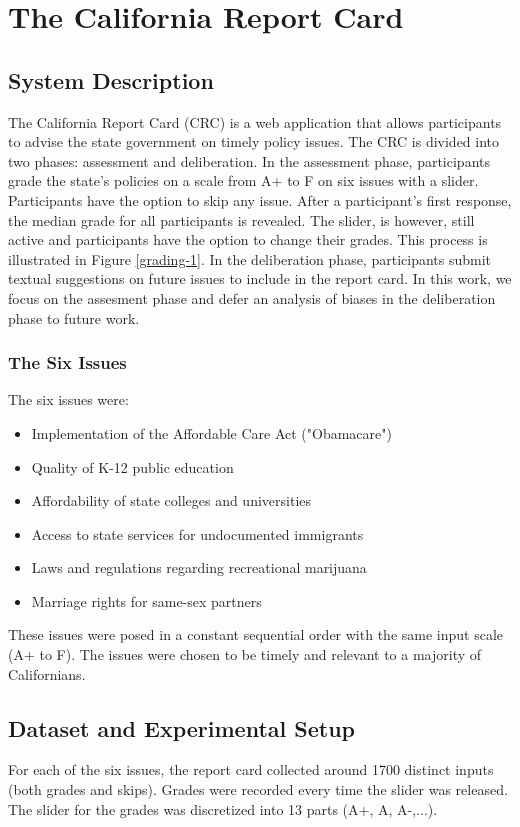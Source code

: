 \section{The California Report Card}
\subsection{System Description}
The California Report Card (CRC) is a web application that allows participants to advise the state government on timely policy issues.
The CRC is divided into two phases: assessment and deliberation.
In the assessment phase, participants grade the state's policies on a scale from A+ to F on six issues with a slider.
Participants have the option to skip any issue.	
After a participant's first response, the median grade for all participants is revealed. 
The slider, is however, still active and participants have the option to change their grades.
This process is illustrated in Figure \ref{grading-1}.
In the deliberation phase, participants submit textual suggestions on future issues to include in the report card.
In this work, we focus on the assesment phase and defer an analysis of biases in the deliberation phase to future work.

\subsubsection{The Six Issues}
The six issues were:
\begin{itemize}
\item Implementation of the Affordable Care Act ("Obamacare")
\item Quality of K-12 public education
\item Affordability of state colleges and universities
\item Access to state services for undocumented immigrants
\item Laws and regulations regarding recreational marijuana
\item Marriage rights for same-sex partners
\end{itemize}
These issues were posed in a constant sequential order with the same input scale (A+ to F).
The issues were chosen to be timely and relevant to a majority of Californians.

\subsection{Dataset and Experimental Setup}
For each of the six issues, the report card collected around 1700 distinct inputs (both grades and skips). 
Grades were recorded every time the slider was released.
The slider for the grades was discretized into 13 parts (A+, A, A-,...).

